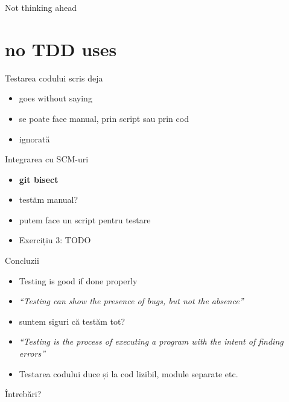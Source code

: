 \documentclass{beamer}
\begin{document}
\begin{frame}{Not thinking ahead}
\end{frame}

\section{no TDD uses}

\begin{frame}{Testarea codului scris deja}
  \begin{itemize}[<+->]
    \item goes without saying
    \item se poate face manual, prin script sau prin cod
    \item ignorată
  \end{itemize}
\end{frame}

\begin{frame}{Integrarea cu SCM-uri}
  \begin{itemize}[<+->]
    \item \textbf{git bisect}
    \item testăm manual?
    \item putem face un script pentru testare
    \item Exercițiu 3: TODO
  \end{itemize}
\end{frame}

\begin{frame}{Concluzii}
  \begin{itemize}[<+->]
    \item Testing is good \pause \alert{if done properly}
    \item \textit{``Testing can show the presence of bugs, but not the absence''}
    \item suntem siguri că testăm tot?
    \item \textit{``Testing is the process of executing a program with the intent of finding errors''}
    \item Testarea codului duce și la cod lizibil, module separate etc.
  \end{itemize}
\end{frame}

\begin{frame}{Întrebări?}
\end{frame}
\end{document}

